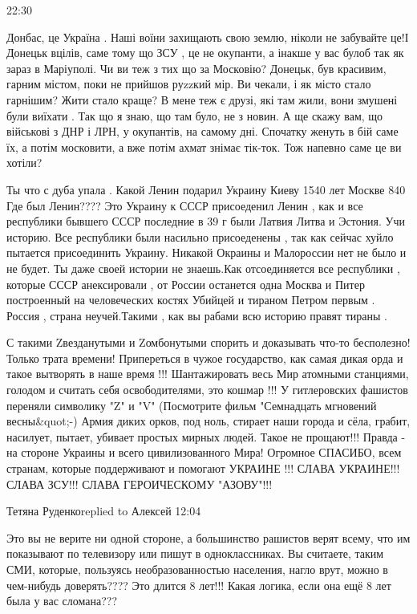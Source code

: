 {%
22:30

Донбас, це Україна . Наші воїни захищають свою землю, ніколи не забувайте це!І
Донецьк вцілів, саме тому що ЗСУ , це не окупанти, а інакше у вас булоб так як
зараз в Маріуполі. Чи ви теж з тих що за Московію? Донецьк, був красивим,
гарним містом, поки не прийшов руzzкий мір. Ви чекали, і як місто стало
гарнішим? Жити стало краще? В мене теж є друзі, які там жили, вони змушені були
виїхати . Так що я знаю, що там було, не з новин. А ще скажу вам, що військові
з ДНР і ЛРН, у окупантів, на самому дні. Спочатку женуть в бій саме їх, а потім
московити, а вже потім ахмат знімає тік-ток. Тож напевно саме це ви хотіли?


Ты что с дуба упала . Какой Ленин подарил Украину Киеву 1540 лет Москве 840 Где
был Ленин???? Это Украину к СССР присоеденил Ленин , как и все республики
бывшего СССР последние в 39 г были Латвия Литва и Эстония. Учи историю. Все
республики были насильно присоеденены , так как сейчас хуйло пытается
присоединить Украину. Никакой Окраины и Малороссии нет не было и не будет. Ты
даже своей истории не знаешь.Как отсоединяется все республики , которые СССР
анексировали , от России останется одна Москва и Питер построенный на
человеческих костях Убийцей и тираном Петром первым . Россия , страна
неучей.Такими , как вы рабами всю историю правят тираны .


С такими Zвезданутыми и Zомбонутыми спорить и доказывать что-то бесполезно!
Только трата времени! Припереться в чужое государство, как самая дикая орда и
такое вытворять в наше время !!! Шантажировать весь Мир атомными станциями,
голодом и считать себя освободителями, это кошмар !!! У гитлеровских фашистов
переняли символику "Z" и "V" (Посмотрите фильм "Семнадцать мгновений
весны&quot;-) Армия диких орков, под ноль, стирает наши города и сёла, грабит,
насилует, пытает, убивает простых мирных людей. Такое не прощают!!! Правда - на
стороне Украины и всего цивилизованного Мира! Огромное СПАСИБО, всем странам,
которые поддерживают и помогают УКРАИНЕ !!! СЛАВА УКРАИНЕ!!! СЛАВА ЗСУ!!! СЛАВА
ГЕРОИЧЕСКОМУ "АЗОВУ"!!!

Тетяна Руденкоreplied to Алексей
12:04

Это вы не верите ни одной стороне, а большинство рашистов верят всему, что им
показывают по телевизору или пишут в одноклассниках. Вы считаете, таким СМИ,
которые, пользуясь необразованностью населения, нагло врут, можно в чем-нибудь
доверять???? Это длится 8 лет!!! Какая логика, если она ещё 8 лет была у вас
сломана???

}
